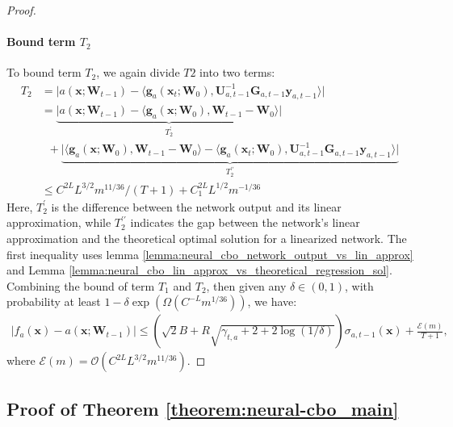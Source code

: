 \begin{proof}
\paragraph{Bound term $T_2$}
To bound term $T_2$, we again divide $T2$ into two terms:
\begin{align*}
    T_2 &=\lvert a(\mathbf{x}; \mathbf{W}_{t-1}) - \langle \mathbf{g}_a(\mathbf{x}_{t};\mathbf{W}_{0}),\mathbf{U}_{a,t-1}^{-1}\mathbf{G}_{a,t-1}\mathbf{y}_{a,t-1} \rangle  \rvert 
    \\
    &= \underbrace{\lvert a(\mathbf{x}; \mathbf{W}_{t-1}) - \langle \mathbf{g}_a(\mathbf{x};\mathbf{W}_0), \mathbf{W}_{t-1} - \mathbf{W}_0 \rangle \rvert}_{T_2^\prime} \\
    & \;\; + \underbrace{\lvert \langle \mathbf{g}_a(\mathbf{x};\mathbf{W}_0), \mathbf{W}_{t-1} - \mathbf{W}_0 \rangle  - \langle \mathbf{g}_a(\mathbf{x}_{t};\mathbf{W}_{0}),\mathbf{U}_{a,t-1}^{-1}\mathbf{G}_{a,t-1}\mathbf{y}_{a,t-1} \rangle   \rvert}_{T_2^{\prime \prime}}
    \\
    & \le C^{2L} L^{3/2} m^{11/36}/ (T+1) + C_1^{2L} L^{1/2} m^{-1/36} 
\end{align*}
Here, $T_2^{\prime}$ is the difference between the network output and its linear approximation, while $T_2^{\prime \prime}$ indicates the gap between the network's linear approximation and the theoretical optimal solution for a linearized network. The first inequality uses lemma \ref{lemma:neural_cbo_network_output_vs_lin_approx} and Lemma \ref{lemma:neural_cbo_lin_approx_vs_theoretical_regression_sol}. Combining the bound of term $T_1$ and $T_2$, then given any $\delta \in (0,1)$,  with probability at least $1 - \delta \exp (\Omega(C^{-L} m^{1/36}))$, we have:
\begin{align*}
     \lvert f_a(\mathbf{x}) - a(\mathbf{x}; \mathbf{W}_{t-1}) \rvert \le  \left(\sqrt{2}B + R \sqrt{\gamma_{t,a} + 2 + 2 \log(1/\delta)}\right)\sigma_{a, t-1}(\mathbf{x}) + \frac{\mathcal{E}(m)}{T+1}, 
\end{align*}
where $\mathcal{E}(m) = \mathcal{O}(C^{2L} L^{3/2} m^{11/36})$.
\end{proof}

\subsection{Proof of Theorem \ref{theorem:neural-cbo_main}}

\TheoremMain*

